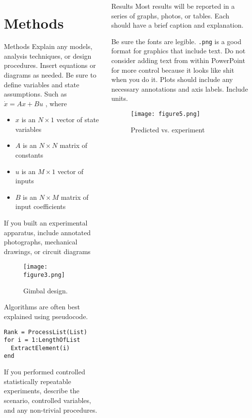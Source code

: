 \documentclass[pdf]{beamer}
\begin{document}
\begin{frame}[fragile]
\begin{columns}
\begin{column}{0.25\textwidth}
\section{Methods}
\begin{block}{Methods}
Explain any models, analysis techniques, or design procedures. Insert equations or diagrams as needed.  Be sure to define variables and state assumptions.  Such as $\dot{x} = Ax+Bu$ , where
\begin{itemize}
\item $x$ is an $N \times 1$ vector of state variables
\item $A$ is an $N \times N$ matrix of constants
\item $u$ is an $M \times 1$ vector of inputs
\item $B$ is an $N \times M$ matrix of input coefficients
\end{itemize}

If you built an experimental apparatus, include annotated photographs,  mechanical drawings, or circuit diagrams
\begin{figure}
\texttt{[image: figure3.png]}
\caption{Gimbal design.}
\end{figure}

Algorithms are often best explained using pseudocode.
\begin{lstlisting}[style=usnaMatlab]
Rank = ProcessList(List)
for i = 1:LengthOfList
  ExtractElement(i)
end
\end{lstlisting}

If you performed controlled statistically repeatable experiments, describe the scenario, controlled variables, and any non-trivial procedures. 
\end{block}
\end{column}

\begin{column}{0.25\textwidth}
\begin{block}{Results}
Most results will be reported in a series of graphs, photos, or tables.   Each should have a brief caption and explanation. 

Be sure the fonts are legible.  \lstinline{.png} is a good format for graphics that include text. Do not consider adding text from within PowerPoint for more control because it looks like shit when you do it.  Plots should include any necessary annotations and axis labels. Include units.
\begin{figure}
\texttt{[image: figure5.png]}
\caption{Predicted vs. experiment}
\end{figure} 


\end{block}
\end{column}
\end{columns}
\end{frame}
\end{document}
